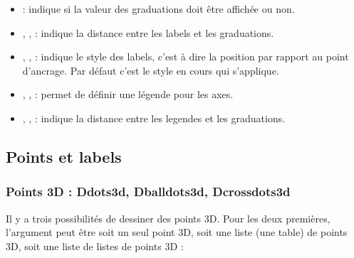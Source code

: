 \begin{itemize}
    \item {} : indique si la valeur des graduations doit être affichée ou non.
    
    \item {}, ,  : indique la distance entre les labels et les graduations.
    
    \item {}, ,  : indique le style des labels, c'est à dire la position par rapport au point d'ancrage. Par défaut c'est le style en cours qui s'applique.

    \item {}, ,  : permet de définir une légende pour les axes.
    
    \item {}, ,  : indique la distance entre les legendes et les graduations.     
\end{itemize}

\subsection{Points et labels}

\subsubsection{Points 3D : Ddots3d, Dballdots3d, Dcrossdots3d}

Il y a trois possibilités de dessiner des points 3D. Pour les deux premières, l'argument  peut être soit un seul point 3D, soit une liste (une table) de points 3D, soit une liste de listes de points 3D :

